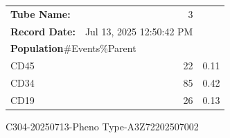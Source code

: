 \documentclass[UTF8,10pt,a4paper,fontset=fandol]{ctexart}
\newcommand{\fieldvalue}[1]{#1}
\begin{document}
\noindent
\begin{tabularx}{0.58\textwidth}{@{}lrr@{}}
\textbf{Tube Name:} &
\fieldvalue{3} & \\

\textbf{Record Date:} &
\fieldvalue{Jul 13, 2025 12:50:42 PM} & \\[0.3em]

\multicolumn{3}{l}{\textbf{Population}\hfill \#Events\quad \%Parent}\\
CD45 &
\fieldvalue{22} &
\fieldvalue{0.11}\\
CD34 &
\fieldvalue{85} &
\fieldvalue{0.42}\\
CD19 &
\fieldvalue{26} &
\fieldvalue{0.13}
\end{tabularx}


\newpage

\begin{center}
\fieldvalue{C304-20250713-Pheno Type-A3Z72202507002}
\end{center}
\end{document}
